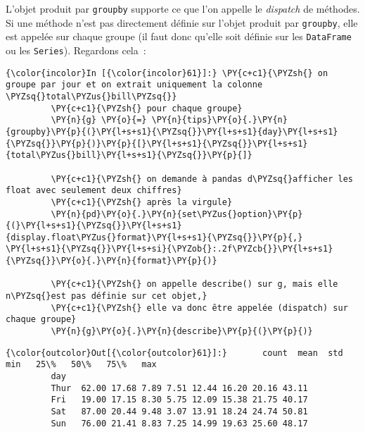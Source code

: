     L'objet produit par \texttt{groupby} supporte ce que l'on appelle le
\emph{dispatch} de méthodes. Si une méthode n'est pas directement
définie sur l'objet produit par \texttt{groupby}, elle est appelée sur
chaque groupe (il faut donc qu'elle soit définie sur les
\texttt{DataFrame} ou les \texttt{Series}). Regardons cela~:

    \begin{Verbatim}[commandchars=\\\{\}]
{\color{incolor}In [{\color{incolor}61}]:} \PY{c+c1}{\PYZsh{} on groupe par jour et on extrait uniquement la colonne \PYZsq{}total\PYZus{}bill\PYZsq{}}
         \PY{c+c1}{\PYZsh{} pour chaque groupe}
         \PY{n}{g} \PY{o}{=} \PY{n}{tips}\PY{o}{.}\PY{n}{groupby}\PY{p}{(}\PY{l+s+s1}{\PYZsq{}}\PY{l+s+s1}{day}\PY{l+s+s1}{\PYZsq{}}\PY{p}{)}\PY{p}{[}\PY{l+s+s1}{\PYZsq{}}\PY{l+s+s1}{total\PYZus{}bill}\PY{l+s+s1}{\PYZsq{}}\PY{p}{]}
         
         \PY{c+c1}{\PYZsh{} on demande à pandas d\PYZsq{}afficher les float avec seulement deux chiffres}
         \PY{c+c1}{\PYZsh{} après la virgule}
         \PY{n}{pd}\PY{o}{.}\PY{n}{set\PYZus{}option}\PY{p}{(}\PY{l+s+s1}{\PYZsq{}}\PY{l+s+s1}{display.float\PYZus{}format}\PY{l+s+s1}{\PYZsq{}}\PY{p}{,} \PY{l+s+s1}{\PYZsq{}}\PY{l+s+si}{\PYZob{}:.2f\PYZcb{}}\PY{l+s+s1}{\PYZsq{}}\PY{o}{.}\PY{n}{format}\PY{p}{)}
         
         \PY{c+c1}{\PYZsh{} on appelle describe() sur g, mais elle n\PYZsq{}est pas définie sur cet objet,}
         \PY{c+c1}{\PYZsh{} elle va donc être appelée (dispatch) sur chaque groupe}
         \PY{n}{g}\PY{o}{.}\PY{n}{describe}\PY{p}{(}\PY{p}{)}
\end{Verbatim}


\begin{Verbatim}[commandchars=\\\{\}]
{\color{outcolor}Out[{\color{outcolor}61}]:}       count  mean  std  min   25\%   50\%   75\%   max
         day                                                
         Thur  62.00 17.68 7.89 7.51 12.44 16.20 20.16 43.11
         Fri   19.00 17.15 8.30 5.75 12.09 15.38 21.75 40.17
         Sat   87.00 20.44 9.48 3.07 13.91 18.24 24.74 50.81
         Sun   76.00 21.41 8.83 7.25 14.99 19.63 25.60 48.17
\end{Verbatim}
            
